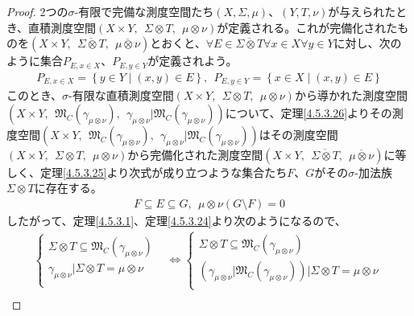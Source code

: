 \documentclass[dvipdfmx]{jsarticle}
\begin{document}
\begin{proof}
2つの$\sigma$-有限で完備な測度空間たち$(X,\varSigma,\mu)$、$(Y,T,\nu)$が与えられたとき、直積測度空間$(X \times Y,\ \ \varSigma \otimes T,\ \ \mu \otimes \nu)$が定義される。これが完備化されたものを$\left( X \times Y,\ \ \overline{\varSigma \otimes T},\ \ \overline{\mu \otimes \nu} \right)$とおくと、$\forall E \in \overline{\varSigma \otimes T}\forall x \in X\forall y \in Y$に対し、次のように集合$P_{E,x \in X}$、$P_{E,y \in Y}$が定義されよう。
\begin{align*}
P_{E,x \in X} = \left\{ y \in Y \middle| (x,y) \in E \right\},\ \ P_{E,y \in Y} = \left\{ x \in X \middle| (x,y) \in E \right\}
\end{align*}
このとき、$\sigma$-有限な直積測度空間$(X \times Y,\ \ \varSigma \otimes T,\ \ \mu \otimes \nu)$から導かれた測度空間$\left( X \times Y,\ \ \mathfrak{M}_{C}\left( \gamma_{\mu \otimes \nu} \right),\ \ \gamma_{\mu \otimes \nu}|\mathfrak{M}_{C}\left( \gamma_{\mu \otimes \nu} \right) \right)$について、定理\ref{4.5.3.26}よりその測度空間$\left( X \times Y,\ \ \mathfrak{M}_{C}\left( \gamma_{\mu \otimes \nu} \right),\ \ \gamma_{\mu \otimes \nu}|\mathfrak{M}_{C}\left( \gamma_{\mu \otimes \nu} \right) \right)$はその測度空間$(X \times Y,\ \ \varSigma \otimes T,\ \ \mu \otimes \nu)$から完備化された測度空間$\left( X \times Y,\ \ \overline{\varSigma \otimes T},\ \ \overline{\mu \otimes \nu} \right)$に等しく、定理\ref{4.5.3.25}より次式が成り立つような集合たち$F$、$G$がその$\sigma$-加法族$\varSigma \otimes T$に存在する。
\begin{align*}
F \subseteq E \subseteq G,\ \ \mu \otimes \nu(G \setminus F) = 0
\end{align*}
したがって、定理\ref{4.5.3.1}、定理\ref{4.5.3.24}より次のようになるので、
\begin{align*}
\left\{ \begin{matrix}
\varSigma \otimes T \subseteq \mathfrak{M}_{C}\left( \gamma_{\mu \otimes \nu} \right) \\
\gamma_{\mu \otimes \nu}|\varSigma \otimes T = \mu \otimes \nu \\
\end{matrix} \right. &\Leftrightarrow \left\{ \begin{matrix}
\varSigma \otimes T \subseteq \mathfrak{M}_{C}\left( \gamma_{\mu \otimes \nu} \right) \\
\left( \gamma_{\mu \otimes \nu}|\mathfrak{M}_{C}\left( \gamma_{\mu \otimes \nu} \right) \right)|\varSigma \otimes T = \mu \otimes \nu \\
\end{matrix} \right.\ \\

\end{align*}
\end{proof}
\end{document}
